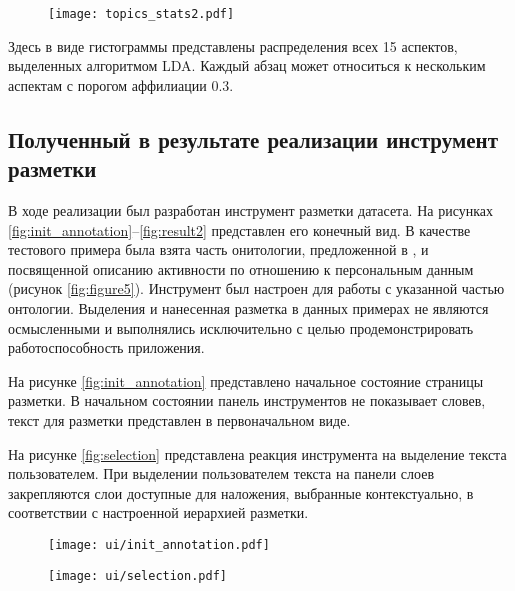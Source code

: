 \documentclass[../main]{subfiles}
\begin{document}
\begin{figure}[H]
    \centering
    {\texttt{[image: topics\_stats2.pdf]}}
    \vspace{-\baselineskip}
\end{figure}

Здесь в виде гистограммы представлены распределения всех 15 аспектов, выделенных алгоритмом LDA. Каждый абзац может относиться к нескольким аспектам с порогом аффилиации 0.3.

\subsection{Полученный в результате реализации инструмент разметки}
\label{sec:real_proto}

В ходе реализации был разработан инструмент разметки датасета. На рисунках \ref{fig:init_annotation}--\ref{fig:result2} представлен его конечный вид. В качестве тестового примера была взята часть онитологии, предложенной в \cite{P2Onto}, и посвященной описанию активности по отношению к персональным данным (рисунок \ref{fig:figure5}). Инструмент был настроен для работы с указанной частью онтологии. Выделения и нанесенная разметка в данных примерах не являются осмысленными и выполнялись исключительно с целью продемонстрировать работоспособность приложения.

На рисунке \ref{fig:init_annotation} представлено начальное состояние страницы разметки. В начальном состоянии панель инструментов не показывает словев, текст для разметки представлен в первоначальном виде.

На рисунке \ref{fig:selection} представлена реакция инструмента на выделение текста пользователем. При выделении пользователем текста на панели слоев закрепляются слои доступные для наложения, выбранные контекстуально, в соответствии с настроенной иерархией разметки.
\begin{figure}[H]
    \centering
    {\texttt{[image: ui/init\_annotation.pdf]}}
    \vspace{-\baselineskip}
\end{figure}
\begin{figure}[H]
    \centering
    {\texttt{[image: ui/selection.pdf]}}
    \vspace{-\baselineskip}
\end{figure}
\end{document}
